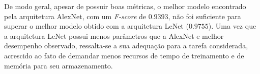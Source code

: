 De modo geral, apesar de possuir boas métricas, o melhor modelo encontrado pela arquitetura AlexNet, com um \emph{F-score} de $0.9393$, não foi suficiente para superar o melhor modelo obtido com a arquitetura LeNet ($0.9755$). Uma vez que a arquitetura LeNet possui menos parâmetros que a AlexNet e melhor desempenho observado, ressalta-se a sua adequação para a tarefa considerada, acrescido ao fato de demandar menos recursos de tempo de treinamento e de memória para seu armazenamento.
